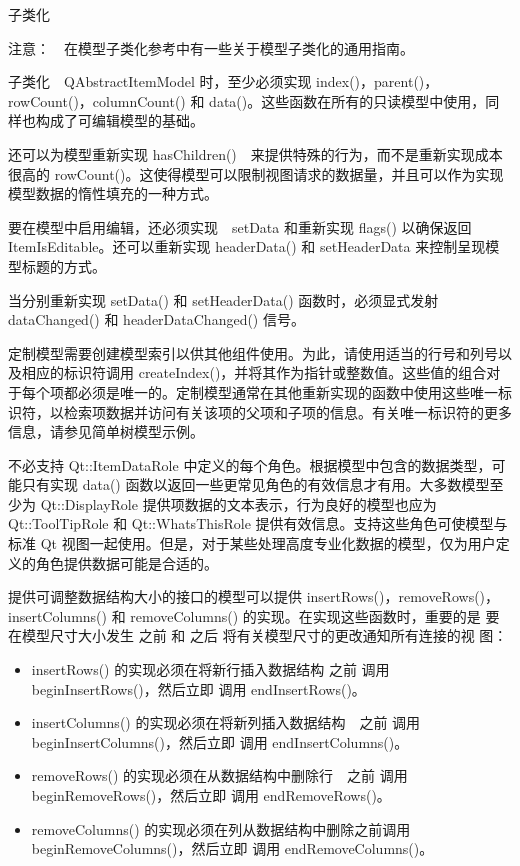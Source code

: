 \splitLine

子类化

注意：　在模型子类化参考中有一些关于模型子类化的通用指南。

子类化　QAbstractItemModel 时，至少必须实现 index()，parent()，rowCount()，columnCount() 和 data()。这些函数在所有的只读模型中使用，同样也构成了可编辑模型的基础。

还可以为模型重新实现 hasChildren()　来提供特殊的行为，而不是重新实现成本很高的 rowCount()。这使得模型可以限制视图请求的数据量，并且可以作为实现模型数据的惰性填充的一种方式。

要在模型中启用编辑，还必须实现　setData 和重新实现 flags() 以确保返回 ItemIsEditable。还可以重新实现 headerData() 和 setHeaderData 来控制呈现模型标题的方式。

当分别重新实现 setData() 和 setHeaderData() 函数时，必须显式发射　dataChanged() 和 headerDataChanged() 信号。

定制模型需要创建模型索引以供其他组件使用。为此，请使用适当的行号和列号以及相应的标识符调用 createIndex()，并将其作为指针或整数值。这些值的组合对于每个项都必须是唯一的。定制模型通常在其他重新实现的函数中使用这些唯一标识符，以检索项数据并访问有关该项的父项和子项的信息。有关唯一标识符的更多信息，请参见简单树模型示例。

不必支持 Qt::ItemDataRole 中定义的每个角色。根据模型中包含的数据类型，可能只有实现 data() 函数以返回一些更常见角色的有效信息才有用。大多数模型至少为 Qt::DisplayRole 提供项数据的文本表示，行为良好的模型也应为 Qt::ToolTipRole 和 Qt::WhatsThisRole 提供有效信息。支持这些角色可使模型与标准 Qt 视图一起使用。但是，对于某些处理高度专业化数据的模型，仅为用户定义的角色提供数据可能是合适的。

提供可调整数据结构大小的接口的模型可以提供 insertRows()，removeRows()，
insertColumns() 和 removeColumns() 的实现。在实现这些函数时，重要的是
要在模型尺寸大小发生 之前 和 之后 将有关模型尺寸的更改通知所有连接的视
图：

\begin{itemize}
\item insertRows() 的实现必须在将新行插入数据结构 之前 调用
  beginInsertRows()，然后立即 调用 endInsertRows()。
\item insertColumns() 的实现必须在将新列插入数据结构　之前 调用
  beginInsertColumns()，然后立即 调用 endInsertColumns()。
\item removeRows() 的实现必须在从数据结构中删除行　之前 调用
  beginRemoveRows()，然后立即 调用 endRemoveRows()。
\item removeColumns() 的实现必须在列从数据结构中删除之前调用 beginRemoveColumns()，然后立即 调用 endRemoveColumns()。
\end{itemize}

